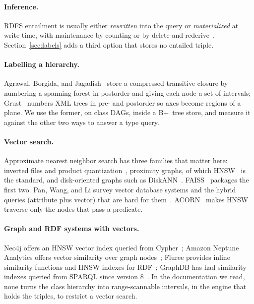 \documentclass[sigconf, nonacm]{acmart}
\begin{document}
\paragraph{Inference.} RDFS entailment is usually either \emph{rewritten} into the query or \emph{materialized} at write time, with maintenance by counting or by delete-and-rederive~\cite{gupta1993}. Section~\ref{sec:labels} adds a third option that stores no entailed triple.

\paragraph{Labelling a hierarchy.} Agrawal, Borgida, and Jagadish~\cite{agrawal1989} store a compressed transitive closure by numbering a spanning forest in postorder and giving each node a set of intervals; Grust~\cite{grust2002} numbers XML trees in pre- and postorder so axes become regions of a plane. We use the former, on class DAGs, inside a B+~tree store, and measure it against the other two ways to answer a type query.

\paragraph{Vector search.} Approximate nearest neighbor search has three families that matter here: inverted files and product quantization~\cite{jegou2011}, proximity graphs, of which HNSW~\cite{malkov2020} is the standard, and disk-oriented graphs such as DiskANN~\cite{subramanya2019}. FAISS~\cite{johnson2021} packages the first two. Pan, Wang, and Li survey vector database systems and the hybrid queries (attribute plus vector) that are hard for them~\cite{pan2024}. ACORN~\cite{patel2024} makes HNSW traverse only the nodes that pass a predicate.

\paragraph{Graph and RDF systems with vectors.} Neo4j offers an HNSW vector index queried from Cypher~\cite{neo4jvec}; Amazon Neptune Analytics offers vector similarity over graph nodes~\cite{neptunevec}; Fluree provides inline similarity functions and HNSW indexes for RDF~\cite{fluree}; GraphDB has had similarity indexes queried from SPARQL since version 8~\cite{graphdbsim}. In the documentation we read, none turns the class hierarchy into range-scannable intervals, in the engine that holds the triples, to restrict a vector search.
\end{document}
